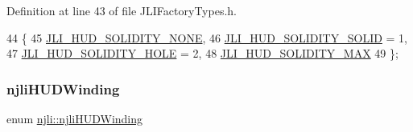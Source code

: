 Definition at line 43 of file J\+L\+I\+Factory\+Types.\+h.


\begin{DoxyCode}
44   \{
45     \mbox{\hyperlink{namespacenjli_adcb6d335a391e792ea49e55a2b394168aeb5dc4f5a237799007ff5bdd20f67bc8}{JLI\_HUD\_SOLIDITY\_NONE}},
46     \mbox{\hyperlink{namespacenjli_adcb6d335a391e792ea49e55a2b394168acdbd067f1e3199418e7885a29809b615}{JLI\_HUD\_SOLIDITY\_SOLID}} = 1,
47     \mbox{\hyperlink{namespacenjli_adcb6d335a391e792ea49e55a2b394168a34496e0246306fde58f04dfdb06e4b07}{JLI\_HUD\_SOLIDITY\_HOLE}} = 2,
48     \mbox{\hyperlink{namespacenjli_adcb6d335a391e792ea49e55a2b394168ac14fdd6428c153de3bc72c7d87cac7f9}{JLI\_HUD\_SOLIDITY\_MAX}}
49   \};
\end{DoxyCode}
\mbox{\label{namespacenjli_adfddace364f1f59d370037cf6f934456}} 
\subsubsection{\texorpdfstring{njli\+H\+U\+D\+Winding}{njliHUDWinding}}
{\footnotesize\ttfamily enum \mbox{\hyperlink{namespacenjli_adfddace364f1f59d370037cf6f934456}{njli\+::njli\+H\+U\+D\+Winding}}}

